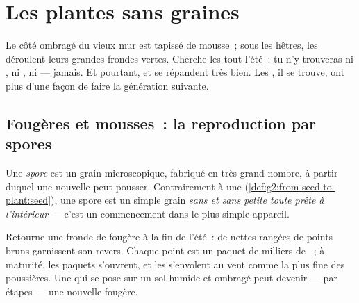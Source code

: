 \chapter{Les plantes sans graines}\label{ch:g4:plants-without-seeds}

Le côté ombragé du vieux mur est tapissé de mousse~; sous les
hêtres, les  déroulent leurs grandes frondes vertes.
Cherche-les tout l'été~: tu n'y trouveras ni , ni , ni
 --- jamais. Et pourtant,  et  se répandent
très bien. Les , il se trouve, ont plus d'une façon de faire
la génération suivante.

\section{Fougères et mousses~: la reproduction par spores}

\begin{definition}[Spore]\label{def:g4:plants-without-seeds:spore}
Une \emph{spore} est un grain microscopique, fabriqué
en très grand nombre, à partir duquel une nouvelle  peut
pousser. Contrairement à une 
(\cref{def:g2:from-seed-to-plant:seed}), une spore est un simple
grain \emph{sans  et sans petite  toute
prête à l'intérieur} --- c'est un commencement dans le plus simple
appareil.
\end{definition}

\begin{example}\label{ex:g4:plants-without-seeds:fern}
Retourne une fronde de fougère à la fin de l'été~: de nettes rangées
de points bruns garnissent son revers. Chaque point est un paquet de
milliers de ~; à maturité, les paquets s'ouvrent, et les
 s'envolent au vent comme la plus fine des poussières. Une
 qui se pose sur un sol humide et ombragé peut devenir --- par
étapes --- une nouvelle fougère.
\end{example}

